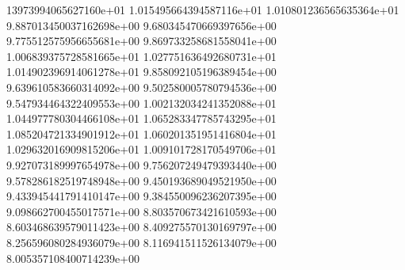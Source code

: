 13973994065627160e+01	1.015495664394587116e+01	1.010801236565635364e+01	9.887013450037162698e+00	9.680345470669397656e+00	9.775512575956655681e+00	9.869733258681558041e+00	1.006839375728581665e+01	1.027751636492680731e+01	1.014902396914061278e+01	9.858092105196389454e+00	9.639610583660314092e+00	9.502580005780794536e+00	9.547934464322409553e+00	1.002132034241352088e+01	1.044977780304466108e+01	1.065283347785743295e+01	1.085204721334901912e+01	1.060201351951416804e+01	1.029632016909815206e+01	1.009101728170549706e+01	9.927073189997654978e+00	9.756207249479393440e+00	9.578286182519748948e+00	9.450193689049521950e+00	9.433945441791410147e+00	9.384550096236207395e+00	9.098662700455017571e+00	8.803570673421610593e+00	8.603468639579011423e+00	8.409275570130169797e+00	8.256596080284936079e+00	8.116941511526134079e+00	8.005357108400714239e+00
